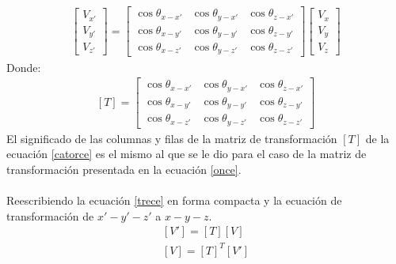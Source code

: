 \documentclass[12pt,letterpaper, twoside, openany]{article}
\begin{document}
\begin{eqnarray}
		\left[ \begin{array}{c} V_{x'} \\
		V_{y'} \\ V_{z'} \end{array} \right] = 
		\left[ \begin{array}{ccc}
		\cos \theta_{x-x'} & \cos \theta_{y-x'} & \cos \theta_{z-x'} \\  
		\cos \theta_{x-y'} & \cos \theta_{y-y'} & \cos \theta_{z-y'} \\
		\cos \theta_{x-z'} & \cos \theta_{y-z'} & \cos \theta_{z-z'}
		\end{array}  \right] 
		\left[ \begin{array}{c} V_{x} \\
		V_{y} \\ V_{z} \end{array} \right]
		\label{trece}
\end{eqnarray}
%
Donde:
%
\begin{align}
	\left[ T \right] = \left[ \begin{array}{ccc}
		\cos \theta_{x-x'} & \cos \theta_{y-x'} & \cos \theta_{z-x'} \\  
		\cos \theta_{x-y'} & \cos \theta_{y-y'} & \cos \theta_{z-y'} \\
		\cos \theta_{x-z'} & \cos \theta_{y-z'} & \cos \theta_{z-z'}
		\end{array}  \right] \label{catorce}
\end{align}
%
El significado de las columnas y filas de la matriz de transformación $\left[ T \right]$ de la ecuación \ref{catorce} es el mismo al que se le dio para el caso de la matriz de transformación presentada en la ecuación \ref{once}.\\\\
%
Reescribiendo la ecuación \ref{trece} en forma compacta y la ecuación de transformación de $x'-y'-z'$ a $x-y-z$.
%
\begin{align*}
	\left[ V' \right] = \left[ T \right] \left[ V \right] \\
	\left[ V \right] = \left[ T \right]^T \left[ V' \right]
\end{align*}
%
%
\end{document}
